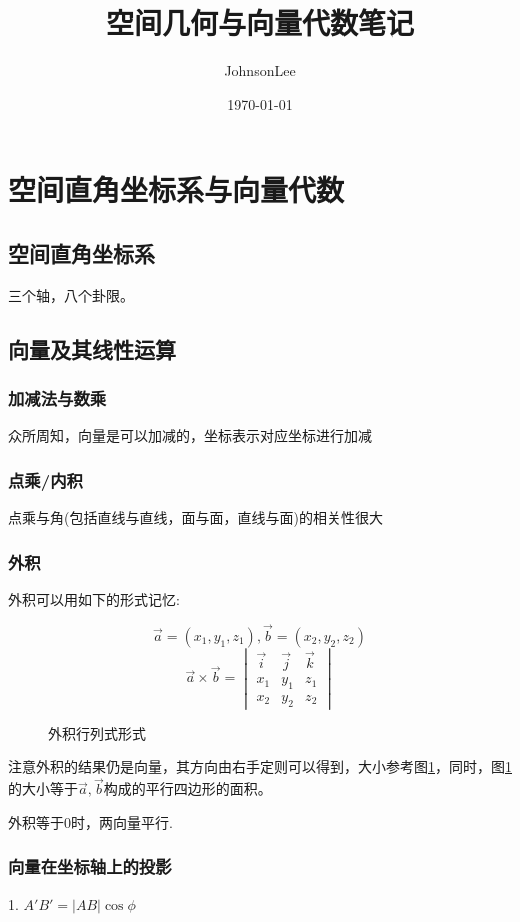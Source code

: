 \documentclass[UTF8]{ctexart}
\title{空间几何与向量代数笔记}
\author{JohnsonLee}
\date{\today}
\begin{document}
\begin{titlepage}
\maketitle
\tableofcontents
\end{titlepage}
\section{空间直角坐标系与向量代数}
\subsection{空间直角坐标系}
三个轴，八个卦限。
\subsection{向量及其线性运算}
\subsubsection{加减法与数乘}
众所周知，向量是可以加减的，坐标表示对应坐标进行加减
\subsubsection{点乘/内积}
点乘与角(包括直线与直线，面与面，直线与面)的相关性很大
\subsubsection{外积}
外积可以用如下的形式记忆:
\begin{figure}[h]
$$\vec a=(x_1,y_1,z_1),\vec b=(x_2,y_2,z_2)$$
$$
  \vec a \times \vec b = 
  \begin{vmatrix}
    \vec i & \vec j & \vec k \\
    x_1 & y_1 & z_1 \\
    x_2 & y_2 & z_2
  \end{vmatrix}
$$  
  \caption{外积行列式形式}
  \label{外积行列式形式}
\end{figure}

注意外积的结果仍是向量，其方向由右手定则可以得到，大小参考图\ref{外积行列式形式}，同时，图\ref{外积行列式形式}的大小等于$\vec a,\vec b$构成的平行四边形的面积。

外积等于$0$时，两向量平行.
\subsubsection{向量在坐标轴上的投影}
    1. $A'B'=|AB|\cos \phi$
\end{document}
